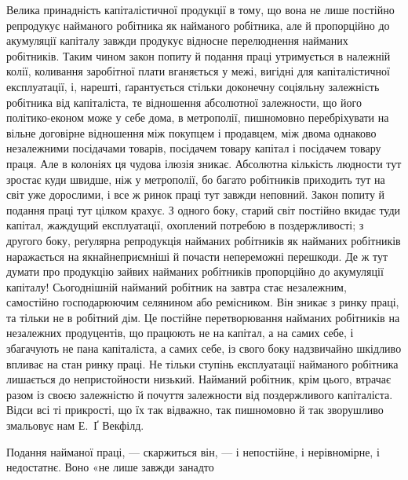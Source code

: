 Велика принадність капіталістичної продукції в тому, що вона не лише постійно репродукує найманого
робітника як найманого робітника, але й пропорційно до акумуляції капіталу завжди продукує відносне
перелюднення найманих робітників.
Таким чином закон попиту й подання праці утримується в належній колії, коливання заробітної плати
вганяється у межі, вигідні для капіталістичної експлуатації, і, нарешті, ґарантується стільки
доконечну соціяльну залежність робітника від
капіталіста, те відношення абсолютної залежности, що його політико-економ може у себе дома, в
метрополії, пишномовно перебріхувати на вільне договірне відношення між покупцем і продавцем, між
двома однаково незалежними посідачами товарів,
посідачем товару капітал і посідачем товару праця. Але в колоніях ця чудова ілюзія зникає. Абсолютна
кількість людности тут зростає куди швидше, ніж у метрополії, бо багато робітників приходить тут на
світ уже дорослими, і все ж ринок праці тут завжди неповний. Закон попиту й подання праці тут цілком
крахує. З одного боку, старий світ постійно вкидає туди капітал, жаждущий експлуатації, охоплений
потребою в
поздержливості; з другого боку, реґулярна репродукція найманих робітників як найманих робітників
наражається на якнайнеприємніші й почасти непереможні перешкоди. Де ж тут думати про продукцію
зайвих найманих робітників пропорційно
до акумуляції капіталу! Сьогоднішній найманий робітник на завтра стає незалежним, самостійно
господарюючим селянином або ремісником. Він зникає з ринку праці, та тільки не в робітний дім. Це
постійне перетворювання найманих робітників на незалежних продуцентів, що працюють не на капітал, а
на самих себе, і збагачують не пана капіталіста, а самих себе, із свого боку надзвичайно шкідливо
впливає на стан
ринку праці. Не тільки ступінь експлуатації найманого робітника лишається до непристойности низький.
Найманий робітник, крім цього, втрачає разом із своєю залежністю й почуття залежности від
поздержливого капіталіста. Відси всі ті прикрості,
що їх так відважно, так пишномовно й так зворушливо змальовує нам Е.~Ґ Векфілд.

Подання найманої праці, — скаржиться він, — і непостійне, і нерівномірне, і недостатнє. Воно «не
лише завжди занадто
\parbreak{}  %
